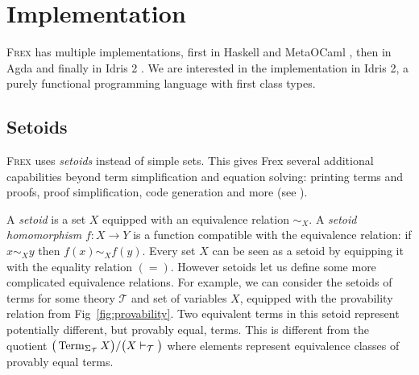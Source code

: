 \section{Implementation}
\label{sec:implementation}

\textsc{Frex} has multiple implementations, first in Haskell and MetaOCaml \parencite{frex_origin}, then in Agda \parencite{agda_frex} and finally in Idris 2 \parencite{idris_frex}. We are interested in the implementation in Idris 2, a purely functional programming language with first class types.

\subsection{Setoids}



\textsc{Frex} uses \emph{setoids} \parencite{setoid1, setoid2} instead of simple sets. This gives Frex several additional capabilities beyond term simplification and equation solving: printing terms and proofs, proof simplification, code generation and more \parencite{idris_frex} (see ). 

A \emph{setoid} is a set $X$ equipped with an equivalence relation $\sim_X$. A \emph{setoid homomorphism} $f : X \to Y$ is a function compatible with the equivalence relation: if $x \sim_X y$ then $f(x) \sim_X f(y)$. Every set $X$ can be seen as a setoid by equipping it with the equality relation $(=)$. However setoids let us define some more complicated equivalence relations. For example, we can consider the setoids of terms for some theory $\mathcal{T}$ and set of variables $X$, equipped with the provability relation from Fig~\ref{fig:provability}. Two equivalent terms in this setoid represent potentially different, but provably equal, terms. This is different from the quotient $\bigr(\operatorname{Term}_{\Sigma_{\mathcal{T}}} X \bigl) / \bigr(X \vdash_{\mathcal{T}}\bigl)$ where elements represent equivalence classes of provably equal terms.


